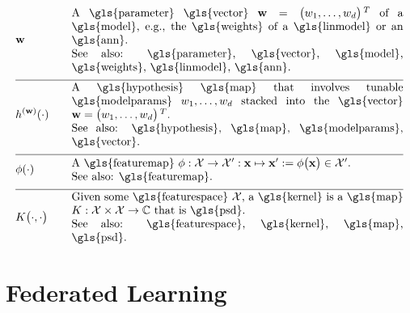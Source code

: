 \begin{align} 
	&\weights  &\quad & \parbox{.85\textwidth}{A \gls{parameter} \gls{vector} $\weights = \big(\weight_{1}, \ldots, \weight_{\featuredim}\big)\,^{T}$ 
		of a \gls{model}, e.g., the \gls{weights} of a \gls{linmodel} or an \gls{ann}.
		\\ See also: \gls{parameter}, \gls{vector}, \gls{model}, \gls{weights}, \gls{linmodel}, \gls{ann}. }     \nonumber \\[2mm] \hline \nonumber\\[-5mm]
	&\hypothesis^{(\weights)}(\cdot)  &\quad &\parbox{.85\textwidth}{A \gls{hypothesis} \gls{map} that involves tunable \gls{modelparams} 
		$\weight_{1}, \ldots, \weight_{\featuredim}$ stacked into the \gls{vector} $\weights=\big(\weight_{1}, \ldots, \weight_{\featuredim} \big)\,^{T}$.
		\\ See also: \gls{hypothesis}, \gls{map}, \gls{modelparams}, \gls{vector}. } \nonumber \\[2mm] \hline \nonumber\\[-5mm]
	&\featuremap(\cdot)  &\quad & \parbox{.85\textwidth}{A \gls{featuremap} 
		$\featuremap: \featurespace \rightarrow \featurespace' : \featurevec \mapsto \featurevec' \defeq \featuremap\big( \featurevec \big) \in \featurespace'$.
		\\ See also: \gls{featuremap}. }   \nonumber \\[2mm] \hline \nonumber\\[-5mm]
	&\kernelmap{\cdot}{\cdot} &\quad & \parbox{.85\textwidth}{Given some \gls{featurespace} $\featurespace$, 
		a \gls{kernel} is a \gls{map} $\kernel: \featurespace \times \featurespace \rightarrow \mathbb{C}$ that is \gls{psd}.
		\\ See also: \gls{featurespace}, \gls{kernel}, \gls{map}, \gls{psd}. }    \nonumber                                                                                                                                                     
\end{align}              






\newpage
\section*{Federated Learning}


